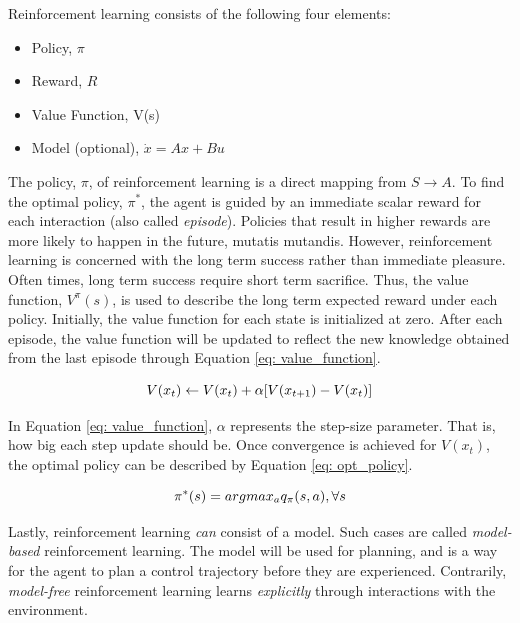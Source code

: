 Reinforcement learning consists of the following four elements:

\begin{itemize}
    \item Policy, $\pi$
    \item Reward, $R$
    \item Value Function, V(s)
    \item Model (optional), $\dot{x} = Ax + Bu$
\end{itemize}

The policy, $\pi$, of reinforcement learning is a direct mapping from $S \rightarrow A$.  To find the optimal policy, $\pi^*$, the agent is guided by an immediate scalar reward for each interaction (also called \textit{episode}). Policies that result in higher rewards are more likely to happen in the future, mutatis mutandis.  However, reinforcement learning is concerned with the long term success rather than immediate pleasure. Often times, long term success require short term sacrifice.  Thus, the value function, $V^{\pi}(s)$, is used to describe the long term expected reward under each policy.  Initially, the value function for each state is initialized at zero.  After each episode, the value function will be updated to reflect the new knowledge obtained from the last episode through Equation \ref{eq: value_function}.

\begin{equation}
    \centering
    V(x_t) \leftarrow V(x_t) + \alpha [V(x_{t + 1}) - V(x_t)]
    \label{eq: value_function}
\end{equation}

In Equation \ref{eq: value_function}, $\alpha$ represents the step-size parameter.  That is, how big each step update should be.  Once convergence is achieved for $V(x_t)$, the optimal policy can be described by Equation \ref{eq: opt_policy}.  

\begin{equation}
    \centering
    \pi^*(s) = argmax_a q_{\pi}(s, a), \forall s 
    \label{eq: opt_policy}
\end{equation}

Lastly, reinforcement learning \textit{can} consist of a model. Such cases are called \textit{model-based} reinforcement learning.  The model will be used for planning, and is a way for the agent to plan a control trajectory before they are experienced.  Contrarily, \textit{model-free} reinforcement learning learns \textit{explicitly} through interactions with the environment.

